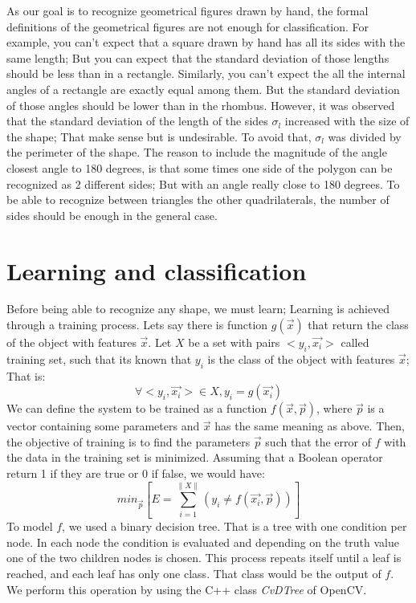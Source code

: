 \documentclass[10pt,journal]{IEEEtran}
\begin{document}
	As our goal is to recognize geometrical figures drawn by hand, the formal definitions
	of the geometrical figures are not enough for classification. For example, you can't expect that 
	a square drawn by hand has all its sides with the same length; But you can expect 
	that the standard deviation of those lengths should be less than in a rectangle.
	Similarly, you can't expect the all the internal angles of a rectangle are
	exactly equal among them. But the standard deviation of those angles should be
	lower than in the rhombus.\newline
	However, it was observed that the standard deviation of the length of the sides
	$\sigma_l$ increased with the size of the shape; That make sense but is
	undesirable. To avoid that, $\sigma_l$ was divided by the perimeter of the shape.
	The reason to include the magnitude of the angle closest angle to 180 degrees, is
	that some times one side of the polygon can be recognized as 2 different sides;
	But with an angle really close to 180 degrees.
	To be able to recognize between triangles the other quadrilaterals, the number of
	sides should be enough in the general case.
	
	\section{Learning and classification}
	Before being able to recognize any shape, we must learn; Learning is achieved
	through a training process.  Lets say there is function $g(\vec{x})$ that 
	return the class of the object with features $\vec{x}$. 
	Let $X$ be a set with pairs $<y_i,\vec{x_i}>$ called training set, such that
	its known that $y_i$ is the class of the object with features $\vec{x}$; That is:
	\[ \forall <y_i,\vec{x_i}> \in X , y_i=g(\vec{x_i}) \]
	We can define the system to be trained as a function $f(\vec{x},\vec{p})$,
	where $\vec{p}$ is a vector containing some parameters and $\vec{x}$ has
	the same meaning as above. Then, the objective of training is to find the
	parameters $\vec{p}$ such that the error of $f$ with the data in the training
	set is minimized. Assuming that a Boolean operator return 1 if they are true
	or 0 if false, we would have:
	\[ min_{\vec{p}} \left[ E = \sum_{i=1}^{\| X \|}  
		( y_i \not= f(\vec{x_i},\vec{p}) ) \right] \]
	To model $f$, we used a binary decision tree\cite{cart}. That is a tree with one
	condition per node. In each node the condition is evaluated and depending
	on the truth value one of the two children nodes is chosen. This process
	repeats itself until a leaf is reached, and each leaf has only one class.
	That class would be the output of $f$. We perform this operation by using the
	C++ class \textit{CvDTree} of OpenCV. 
	
\end{document}
